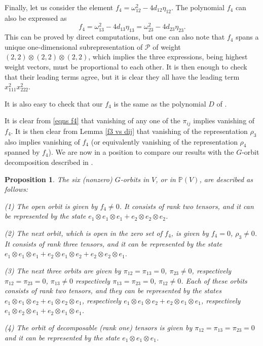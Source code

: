 \documentclass[reqno,11pt]{amsart}
\newtheorem{prop}[equation]{Proposition}
\theoremstyle{remark}
\theoremstyle{definition}
\numberwithin{equation}{section}
\newcommand\ot{\otimes}
\newcommand{\eq}{\begin{equation}}
\newcommand{\eeq}{\end{equation}}
\newcommand{\Pol}{\mathcal{P}}
\newcommand{\bbP}{\mathbb{P}}
\begin{document}
Finally, let us consider the element $f_4=\omega_{12}^2-4d_{12}\eta_{12}$. The polynomial $f_4$ can also be expressed as
\eq
\label{eqns f4}
f_4=\omega_{13}^2-4d_{13}\eta_{13}=\omega_{23}^2-4d_{23}\eta_{23}.
\eeq
This can be proved by direct computations, but one can also note that $f_4$ spans a unique one-dimensional subrepresentation of $\Pol$ of weight $(2,2)\ot(2,2)\ot(2,2)$, which implies the three expressions, being highest weight vectors, must be proportional to each other. It is then enough to check that their leading terms agree, but it is clear they all have the leading term $x_{111}^2x_{222}^2$.

It is also easy to check that our $f_4$ is the same as the polynomial $D$ of \cite[\S 1.4]{B}.

It is clear from \eqref{eqns f4} that vanishing of any one of the $\pi_{ij}$ implies vanishing of $f_4$. It is then clear from Lemma \ref{f3 vs dij} that vanishing of the representation $\rho_3$ also implies vanishing of $f_4$ (or equivalently vanishing of the representation $\rho_4$ spanned by $f_4$). We are now in a position to compare our results with the $G$-orbit decomposition described in \cite[Proposition 1.7]{B}.

\begin{prop} The six (nonzero) $G$-orbits in $V$, or in $\bbP(V)$, are described as follows:

(1) The open orbit is given by $f_4\neq 0$. It consists of rank two tensors, and it can be represented by the state $e_1\ot e_1\ot e_1+e_2\ot e_2\ot e_2$.

(2) The next orbit, which is open in the zero set of $f_4$, is given by $f_4=0$, $\rho_3\neq 0$. It consists of rank three tensors, and it can be represented by the state $e_1\ot e_1\ot e_1+e_2\ot e_1\ot e_2+e_2\ot e_2\ot e_1$.

(3) The next three orbits are given by $\pi_{12}=\pi_{13}=0$, $\pi_{23}\neq 0$, respectively $\pi_{12}=\pi_{23}=0$, $\pi_{13}\neq 0$ respectively $\pi_{13}=\pi_{23}=0$, $\pi_{12}\neq 0$. Each of these orbits consists of rank two tensors, and they can be represented by the states $e_1\ot e_1\ot e_2+e_1\ot e_2\ot e_1$, respectively $e_1\ot e_1\ot e_2+e_2\ot e_1\ot e_1$, respectively $e_1\ot e_2\ot e_1+e_2\ot e_1\ot e_1$.

(4) The orbit of decomposable (rank one) tensors is given by $\pi_{12}=\pi_{13}=\pi_{23}= 0$ and it can be represented by the state $e_1\ot e_1\ot e_1$.
\end{prop}
\end{document}
